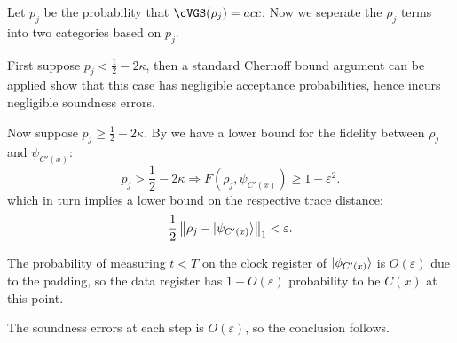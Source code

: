 \begin{prf}
	Let $p_j$ be the probability that $\cVGS(\rho_j)=acc$. Now we seperate the $\rho_j$ terms into two categories based on $p_j$.

	First suppose $p_j<\frac{1}{2}-2\kappa$,
	then a standard Chernoff bound argument can be applied show that this case has negligible acceptance probabilities,
	hence incurs negligible soundness errors.

    
	Now suppose $p_j\geq\frac{1}{2}-2\kappa$.
	By  we have a lower bound for the fidelity between $\rho_j$ and $\psi_{C'(x)}$:
	$$p_j>\frac{1}{2}-2\kappa\Rightarrow F(\rho_j, \psi_{C'(x)})\geq1-\varepsilon^2.$$
	which in turn implies a lower bound on the respective trace distance:
	$$\frac{1}{2}\left\lVert\rho_j - \ket{\psi_{C'(x)}}\right\rVert_1<\varepsilon.$$

	The probability of measuring $t<T$ on the clock register of $\ket{\phi_{C'(x)}}$ is $O(\varepsilon)$ due to the padding,
	so the data register has $1-O(\varepsilon)$ probability to be $C(x)$ at this point.

	The soundness errors at each step is $O(\varepsilon)$, so the conclusion follows.
\end{prf}
